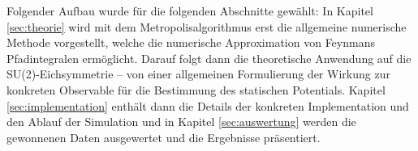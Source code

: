 Folgender Aufbau wurde für die folgenden Abschnitte gewählt: In Kapitel
\ref{sec:theorie} wird mit dem Metropolisalgorithmus erst die allgemeine
numerische Methode
vorgestellt, welche die numerische Approximation von Feynmans Pfadintegralen
ermöglicht. Darauf folgt dann die theoretische Anwendung auf die SU(2)-Eichsymmetrie
-- von einer allgemeinen Formulierung der Wirkung zur konkreten Observable für die 
Bestimmung des statischen Potentials. Kapitel \ref{sec:implementation}
enthält dann die Details der konkreten Implementation und den Ablauf der 
Simulation und in Kapitel \ref{sec:auswertung} werden die gewonnenen
Daten ausgewertet und die Ergebnisse präsentiert.

